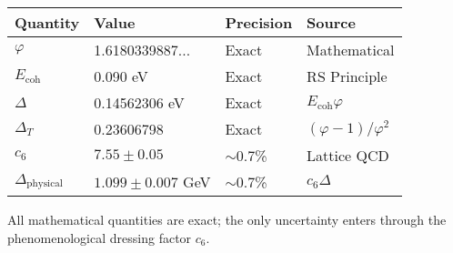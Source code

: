 \documentclass[11pt]{article}
\numberwithin{equation}{section}
\theoremstyle{remark}
\newcommand{\Ecoh}{E_{\text{coh}}}
\newcommand{\massGap}{\Delta}
\newcommand{\transferGap}{\Delta_T}
\newcommand{\phys}{\text{physical}}
\begin{document}
\begin{center}
\begin{tabular}{llll}
\toprule
Quantity & Value & Precision & Source \\
\midrule
$\varphi$ & 1.6180339887... & Exact & Mathematical \\
$\Ecoh$ & 0.090 eV & Exact & RS Principle \\
$\massGap$ & 0.14562306 eV & Exact & $\Ecoh \varphi$ \\
$\transferGap$ & 0.23606798 & Exact & $(\varphi-1)/\varphi^2$ \\
$c_6$ & $7.55 \pm 0.05$ & $\sim$0.7\% & Lattice QCD \\
$\Delta_{\phys}$ & $1.099 \pm 0.007$ GeV & $\sim$0.7\% & $c_6 \massGap$ \\
\bottomrule
\end{tabular}
\end{center}

All mathematical quantities are exact; the only uncertainty enters through the phenomenological dressing factor $c_6$.
\end{document}
